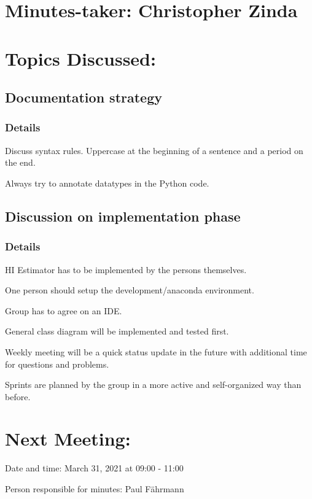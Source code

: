 \documentclass[11pt]{meetingmins} %
\begin{document}
\maketitle

\section{Minutes-taker: Christopher Zinda}

\section{Topics Discussed:}

\subsection{Documentation strategy}
\subsubsection{Details}
\begin{hiddensubitems}
    \item Discuss syntax rules. Uppercase at the beginning of a sentence and a period on the end.
    \item Always try to annotate datatypes in the Python code.
\end{hiddensubitems}

\subsection{Discussion on implementation phase}
\subsubsection{Details}
\begin{hiddensubitems}
    \item HI Estimator has to be implemented by the persons themselves.
    \item One person should setup the development/anaconda environment.
    \item Group has to agree on an IDE.
    \item General class diagram will be implemented and tested first.
    \item Weekly meeting will be a quick status update in the future with additional time for questions and problems.
    \item Sprints are planned by the group in a more active and self-organized way than before.
\end{hiddensubitems}

\section{Next Meeting:}
\begin{hiddensubitems}
    \item Date and time: March 31, 2021 at 09:00 - 11:00
    \item Person responsible for minutes: Paul Fährmann
\end{hiddensubitems}
\end{document}
